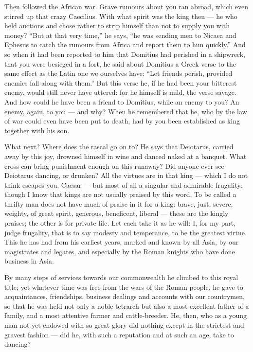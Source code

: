  Then followed the African war. Grave rumours about you ran abroad, which even stirred up that crazy Caecilius. With what spirit was the king then --- he who held auctions and chose rather to strip himself than not to supply you with money? ``But at that very time,'' he says, ``he was sending men to Nicaea and Ephesus to catch the rumours from Africa and report them to him quickly.'' And so when it had been reported to him that Domitius had perished in a shipwreck, that you were besieged in a fort, he said about Domitius a Greek verse to the same effect as the Latin one we ourselves have: ``Let friends perish, provided enemies fall along with them.'' But this verse he, if he had been your bitterest enemy, would still never have uttered: for he himself is mild, the verse savage. And how could he have been a friend to Domitius, while an enemy to you? An enemy, again, to you --- and why? When he remembered that he, who by the law of war could even have been put to death, had by you been established as king together with his son.

 What next? Where does the rascal go on to? He says that Deiotarus, carried away by this joy, drowned himself in wine and danced naked at a banquet. What cross can bring punishment enough on this runaway? Did anyone ever see Deiotarus dancing, or drunken? All the virtues are in that king --- which I do not think escapes you, Caesar --- but most of all a singular and admirable frugality: though I know that kings are not usually praised by this word. To be called a thrifty man does not have much of praise in it for a king: brave, just, severe, weighty, of great spirit, generous, beneficent, liberal --- these are the kingly praises; the other is for private life. Let each take it as he will: I, for my part, judge frugality, that is to say modesty and temperance, to be the greatest virtue. This he has had from his earliest years, marked and known by all Asia, by our magistrates and legates, and especially by the Roman knights who have done business in Asia.

 By many steps of services towards our commonwealth he climbed to this royal title; yet whatever time was free from the wars of the Roman people, he gave to acquaintances, friendships, business dealings and accounts with our countrymen, so that he was held not only a noble tetrarch but also a most excellent father of a family, and a most attentive farmer and cattle-breeder. He, then, who as a young man not yet endowed with so great glory did nothing except in the strictest and gravest fashion --- did he, with such a reputation and at such an age, take to dancing?

